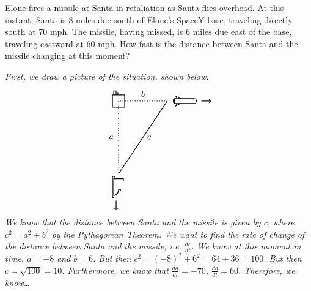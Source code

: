 \documentclass[12pt,letterpaper]{exam}
\newcommand{\myarc}[6]{\draw[#1] ({#2+#4*cos(#5)},{#3+#4*sin(#5)}) arc (#5:#6:#4)}
\begin{document}
\begin{questions}
\newpage
{} \par\vspace{0.3cm}

Elone fires a missile at Santa in retaliation as Santa flies overhead. At this instant, Santa is 8 miles due south of Elone’s SpaceY base, traveling directly south at 70 mph. The missile, having missed, is 6 miles due east of the base, traveling eastward at 60 mph. How fast is the distance between Santa and the missile changing at this moment? \pspace

{\itshape \tsol First, we draw a picture of the situation, shown below.
	\[
	\begin{tikzpicture}
	\draw[line width=0.03cm] (-0.25,-0.25) -- (0.25,-0.25) -- (0.25,0.25) -- (-0.25,0.25) -- (-0.25,-0.25);
	\draw[line width=0.03cm] (-0.1,0.25) -- (-0.1,0.42) -- (-0.2,0.42) -- (-0.2,0.25);
	\draw[line width=0.03cm] (0,0.25) -- (0,0.35) -- (-0.05,0.35) -- (-0.05,0.25);
	\draw[line width=0.03cm,dotted] (2,0) -- (0,0) -- (0,-3);
	\draw[line width=0.03cm] (0,-3) -- (2,0);
	\draw[line width=0.03cm] (0.2,-3.3) -- (0.2,-3.2) -- (-0.2,-3.2) -- (-0.2,-3.9);
	\myarc{line width=0.03cm}{-0.21}{-3.69}{0.2}{270}{360};
	\myarc{line width=0.03cm}{0.04}{-3.69}{0.05}{0}{180};
	\draw[line width=0.03cm] (-0.25,-3.15) -- (-0.25,-4);
	\myarc{line width=0.03cm}{-0.25}{-3.936}{0.05}{270}{360};
	\myarc{line width=0.03cm}{-0.20}{-3.15}{0.05}{0}{180};
	\draw[line width=0.03cm,->] (-0.1,-4.1) -- (-0.1,-4.5);
	\draw[line width=0.03cm] (3.1,0.1) -- (2.3,0.1) -- (2.3,-0.1) -- (3.1,-0.1);
	\myarc{line width=0.03cm}{3.1}{0}{0.1}{-90}{90};
	\draw[line width=0.03cm] (2.3,0.05) -- (2.25,0.05) -- (2.25,-0.05) -- (2.3,-0.05);
	\draw[line width=0.03cm] (2.55,0.1) -- (2.35,0.2) -- (2.4,0.1);
	\draw[line width=0.03cm] (2.55,-0.1) -- (2.35,-0.2) -- (2.4,-0.1);
	\draw[line width=0.03cm,->] (3.4,0) -- (3.8,0);
	\node at (-0.3,-1.5) {$a$};
	\node at (1,0.3) {$b$};
	\node at (1.25,-1.5) {$c$};
	\end{tikzpicture}
	\]
We know that the distance between Santa and the missile is given by $c$, where $c^2= a^2 + b^2$ by the Pythagorean Theorem. We want to find the rate of change of the distance between Santa and the missile, i.e. $\frac{dc}{dt}$. We know at this moment in time, $a= -8$ and $b= 6$. But then $c^2= (-8)^2 + 6^2= 64 + 36= 100$. But then $c= \sqrt{100}= 10$. Furthermore, we know that $\frac{da}{dt}= -70$, $\frac{db}{dt}= 60$. Therefore, we know\dots
}
\end{questions}
\end{document}
